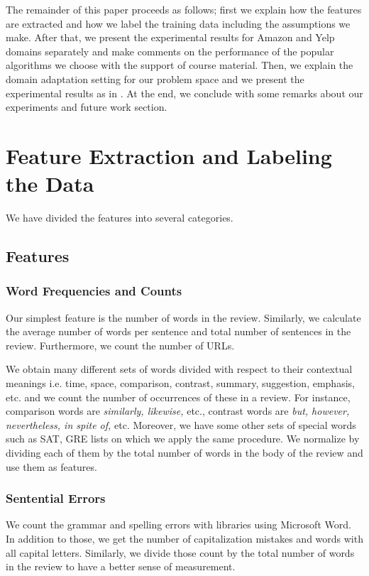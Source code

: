 \documentclass[letterpaper]{article}
\begin{document}
The remainder of this paper proceeds as follows; first we explain how
the features are extracted and how we label the training data
including the assumptions we make. After that, we present the
experimental results for Amazon and Yelp domains separately and make
comments on the performance of the popular algorithms we choose with
the support of course material. Then, we explain the domain adaptation
setting for our problem space and we present the experimental results
as in \cite{JennLearnDiffDomains}. At the end, we conclude with some
remarks about our experiments and future work section.

\section{Feature Extraction and Labeling the Data}
We have divided the features into several categories.
\subsection{Features}
\label{sec:features}
\subsubsection{Word Frequencies and Counts}
Our simplest feature is the number of words in the review. Similarly,
we calculate the average number of words per sentence and
total number of sentences in the review. Furthermore, we count the
number of URLs.

We obtain many different sets of words divided with respect to their
contextual meanings i.e. time, space, comparison, contrast, summary,
suggestion, emphasis, etc. and we count the number of occurrences of
these in a review. For instance, comparison words are
\emph{similarly, likewise,} etc., contrast words are \emph{but,
  however, nevertheless, in spite of,} etc. Moreover, we have some
other sets of special words such as SAT, GRE lists on which we apply the same procedure.  We normalize by dividing each of them by the total
number of words in the body of the review and use them as features.   

\subsubsection{Sentential Errors}
We count the grammar and spelling errors with libraries using
Microsoft Word. In addition to those, we get the number of
capitalization mistakes and words with all capital letters. Similarly, we
divide those count by the total number of words in the review to have
a better sense of measurement.  
\end{document}
